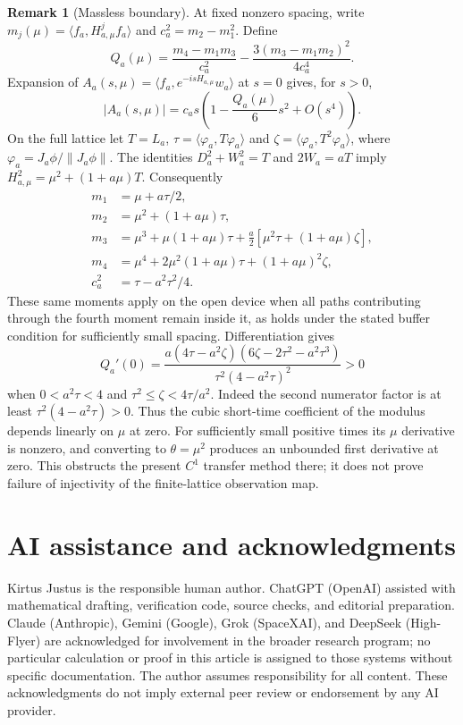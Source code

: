 \documentclass[11pt]{article}
\theoremstyle{definition}
\newtheorem{remark}[theorem]{Remark}
\begin{document}
\begin{remark}[Massless boundary]
At fixed nonzero spacing, write
$m_j(\mu)=\langle f_a,H_{a,\mu}^j f_a\rangle$ and
$c_a^2=m_2-m_1^2$. Define
\[
 Q_a(\mu)=\frac{m_4-m_1m_3}{c_a^2}
 -\frac{3(m_3-m_1m_2)^2}{4c_a^4}.
\]
Expansion of $A_a(s,\mu)=\langle f_a,e^{-isH_{a,\mu}}w_a\rangle$
at $s=0$ gives, for $s>0$,
\[
 |A_a(s,\mu)|=c_as\left(1-\frac{Q_a(\mu)}6s^2+O(s^4)\right).
\]
On the full lattice let $T=L_a$, $\tau=\langle\varphi_a,T\varphi_a\rangle$
and $\zeta=\langle\varphi_a,T^2\varphi_a\rangle$, where
$\varphi_a=J_a\phi/\|J_a\phi\|$.
The identities $D_a^2+W_a^2=T$ and $2W_a=aT$ imply
$H_{a,\mu}^2=\mu^2+(1+a\mu)T$. Consequently
\begin{align*}
 m_1&=\mu+a\tau/2,\\
 m_2&=\mu^2+(1+a\mu)\tau,\\
 m_3&=\mu^3+\mu(1+a\mu)\tau+
       \tfrac a2[\mu^2\tau+(1+a\mu)\zeta],\\
 m_4&=\mu^4+2\mu^2(1+a\mu)\tau+(1+a\mu)^2\zeta,\\
 c_a^2&=\tau-a^2\tau^2/4.
\end{align*}
These same moments apply on the open device when all paths contributing
through the fourth moment remain inside it, as holds under the stated
buffer condition for sufficiently small spacing. Differentiation gives
\[
 Q_a'(0)=
 \frac{a(4\tau-a^2\zeta)(6\zeta-2\tau^2-a^2\tau^3)}
 {\tau^2(4-a^2\tau)^2}>0
\]
when $0<a^2\tau<4$ and $\tau^2\le\zeta<4\tau/a^2$.
Indeed the second numerator factor is at least
$\tau^2(4-a^2\tau)>0$. Thus the cubic short-time coefficient
of the modulus depends linearly on $\mu$ at zero. For sufficiently small
positive times its $\mu$ derivative is nonzero, and converting to
$\theta=\mu^2$ produces an unbounded first derivative at zero.
This obstructs the present $C^1$ transfer method there; it does not prove
failure of injectivity of the finite-lattice observation map.
\end{remark}

\section*{AI assistance and acknowledgments}
Kirtus Justus is the responsible human author. ChatGPT (OpenAI) assisted with mathematical drafting, verification code, source checks, and editorial preparation. Claude (Anthropic), Gemini (Google), Grok (SpaceXAI), and DeepSeek (High-Flyer) are acknowledged for involvement in the broader research program; no particular calculation or proof in this article is assigned to those systems without specific documentation. The author assumes responsibility for all content. These acknowledgments do not imply external peer review or endorsement by any AI provider.
\end{document}
